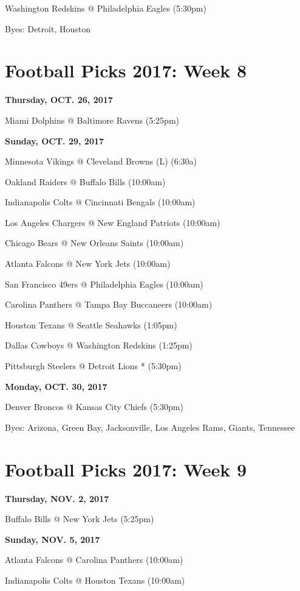 \documentclass[11pt, letterpaper]{article}
\begin{document}
Washington Redskins @ Philadelphia Eagles (5:30pm)\par
\vfill{}
Byes:  Detroit,  Houston
\newpage \section*{\LARGE Football Picks 2017: Week 8}
\noindent \normalsize \textbf{Thursday, OCT.    26, 2017} \par
Miami Dolphins @ Baltimore Ravens (5:25pm)\par
\noindent \normalsize \textbf{Sunday, OCT. 29, 2017} \par
Minnesota Vikings @ Cleveland Browns (L) (6:30a)\par
Oakland Raiders @ Buffalo Bills (10:00am)\par
Indianapolis Colts @ Cincinnati Bengals (10:00am)\par
Los Angeles Chargers @ New England Patriots (10:00am)\par
Chicago Bears @ New Orleans Saints (10:00am)\par
Atlanta Falcons @ New York Jets (10:00am)\par
San Francisco 49ers @ Philadelphia Eagles (10:00am)\par
Carolina Panthers @ Tampa Bay Buccaneers (10:00am)\par
Houston Texans @ Seattle Seahawks (1:05pm)\par
Dallas Cowboys @ Washington Redskins (1:25pm)\par
Pittsburgh Steelers @ Detroit Lions * (5:30pm)\par
\noindent \normalsize \textbf{Monday, OCT. 30, 2017} \par
Denver Broncos @ Kansas City Chiefs (5:30pm)\par
\vfill{}
Byes:  Arizona,  Green Bay,     Jacksonville, 
                      Los Angeles Rams,   Giants,  Tennessee
\newpage \section*{\LARGE Football Picks 2017: Week 9}
\noindent \normalsize \textbf{Thursday, NOV.    2, 2017} \par
Buffalo Bills @ New York Jets (5:25pm)\par
\noindent \normalsize \textbf{Sunday, NOV. 5, 2017} \par
Atlanta Falcons @ Carolina Panthers (10:00am)\par
Indianapolis Colts @ Houston Texans (10:00am)\par
\end{document}
